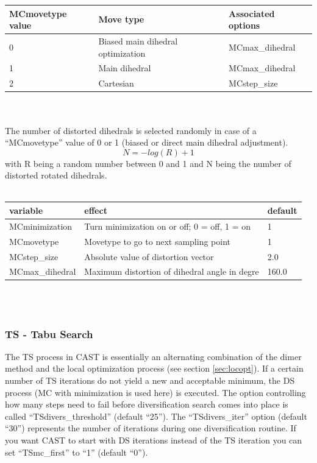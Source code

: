 \documentclass[10pt,a4paper]{article} %
\begin{document}
	\begin{tabularx}{\textwidth}{l|X|X}
		MCmovetype value & Move type & Associated options \\
		\hline
		0 & Biased main dihedral optimization & MCmax\_dihedral \\
		1 & Main dihedral & MCmax\_dihedral \\
		2 & Cartesian & MCstep\_size \\
	\end{tabularx}
	\\~\\
	The number of distorted dihedrals is selected randomly in case of a ``MCmovetype'' value of 0 or 1 (biased or direct main dihedral adjustment).
	\begin{equation}
	N = - log (R) + 1
	\end{equation}
	with R being a random number between 0 and 1 and N being the number of distorted rotated dihedrals.\\~\\
	\begin{tabularx}{\textwidth}{l|X|X}
		variable & effect & default \\
		\hline
		MCminimization & Turn minimization on or off; 0 = off, 1 = on & 1 \\
		MCmovetype & Movetype to go to next sampling point & 1 \\
		MCstep\_size & Absolute value of distortion vector & 2.0 \\
		MCmax\_dihedral & Maximum distortion of dihedral angle in degre & 160.0 \\
	\end{tabularx}
	\\~\\
		
	\subsubsection{TS - Tabu Search}
	The \acf{TS} process in \ac{CAST} is essentially an alternating combination of the dimer method\cite{dimermethod} and the local optimization process (see section \ref{sec:locopt}).
	If a certain number of \ac{TS} iterations do not yield a new and acceptable minimum, the \acf{DS} process (\ac{MC} with minimization is used here) is executed. The option controlling how many steps need to fail before diversification search comes into place is called ``TSdivers\_threshold'' (default ``25'').
	The ``TSdivers\_iter'' option (default ``30'') represents the number of iterations during one diversification routine.
	If you want \ac{CAST} to start with \ac{DS} iterations instead of the \ac{TS} iteration you can set ``TSmc\_first'' to ``1'' (default ``0'').\\~\\
	
\end{document}
